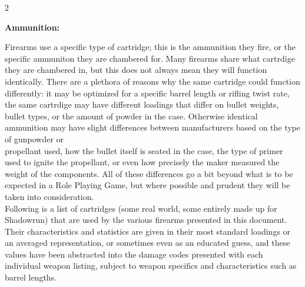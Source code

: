 \documentclass[
  oneside]{article}
\begin{document}
\begin{multicols}{2}

\textbf{Ammunition:}

Firearms use a specific type of cartridge; this is
the ammunition they fire, or the specific
ammuniton they are chambered for. Many firearms
share what cartrdige they are chambered in, but
this does not always mean they will function
identically. There are a plethora of reasons why
the same cartridge could function differently: it
may be optimized for a specific barrel length or
rifling twist rate, the same cartrdige may have
different loadings that differ on bullet weights,
bullet types, or the amount of powder in the case.
Otherwise identical ammunition may have slight
differences between manufacturers based on the
type of gunpowder or\\
propellant used, how the bullet itself is seated
in the case, the type of primer used to ignite the
propellant, or even how precisely the maker
measured the weight of the components. All of
these differences go a bit beyond what is to be
expected in a Role Playing Game, but where
possible and prudent they will be taken into
consideration.\\
Following is a list of cartridges (some real
world, some entirely made up for Shadowrun) that
are used by the various firearms presented in this
document. Their characteristics and statistics are
given in their most standard loadings or an
averaged representation, or sometimes even as an
educated guess, and these values have been
abstracted into the damage codes presented with
each individual weapon listing, subject to weapon
specifics and characteristics such as barrel
lengths.

\end{multicols}
\end{document}
